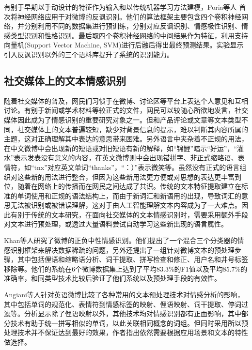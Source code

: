 有别于早期以手动设计的特征作为输入和以传统机器学习方法建模，Poria等人 \cite{poria2016deeper} 首次将神经网络应用于对微博的反讽识别。他们的算法框架主要包含四个卷积神经网络，并分别利用不同的数据集进行预训练，分别对应反讽识别、情感极性识别、情感类型识别和性格识别。最后取四个卷积神经网络的中间结果作为特征，利用支持向量机(Support Vector Machine, SVM)进行后融后得出最终预测结果。实验显示引入反讽识别以外的三个语料库提升了系统的识别能力。

\subsection{社交媒体上的文本情感识别}

随着社交媒体的普及，网民们习惯于在微博、讨论区等平台上表达个人意见和互相讨论。有别于新闻或学术材料等较正式的文件，网民可以较随心所欲地发言，社交媒体因此成为了情感识别的重要研究对象之一。但和产品评论或文章等文本类型不同，社交媒体上的文本普遍较短\cite{Madhusudhanan2018survey}，缺少对背景信息的提示，难以判断其内容所属的主题，这对正确理解其中表达的意思带来困难。另外语言中夹杂着不正规的用法，在中文微博中会出现新的短语或对旧短语有新的解释\cite{xie2012jiyu}，如“锦鲤”暗示“好运”，“灌水”表示发表没有意义的内容，在英文微博则中会出现错拼字、非正式缩略语、表情符\cite{go2009twitter}\cite{paltoglou2012twitter}，如“tnx”对应英文单词“thanks”，“：）”表示微笑等。虽然没有正式的语言组织对这些新的用法进行整合，但因为这些新用法更方便或对思想的表达更丰富到位，随着在网络上的传播而在网民之间达成了共识。传统的文本特征提取建立在标准的单词使用和正规的语法结构上，而由于新词汇和新语用的出现，导致词汇的意思无法被识别或被错误理解，这对于由人工智能理解文本内容成为了一大难点。因此有别于传统的文本研究，在面向社交媒体的文本情感识别时，需要采用额外手段对文本进行预处理，或透过大量语料尝试自动学习这些新出现的语言属性。

Khan等人\cite{khan2014tom}研究了微博的正负中性情感识别。他们提出了一个混合三个分类器的情感识别框架来解决数据稀疏的问题，另外还提出了一组针对微博文本的预处理步骤，其中包括俚语和缩略语分析、词干提取、拼写检查和修正、用户名和井号标签移除等。他们的系统在6个微博数据集上达到了平均83.3\%的F1值以及平均85.7\%的准确率，和同类型技术比较后验证了他们系统以及预处理手段的有效性。

Angiani等人\cite{angiani2016comparison}针对英语微博比较了各种常用的文本预处理技术对情感分析的影响，其中包括单词的规范化、表情符到情感标签的映射、俚语映射、词干提取、停词过滤等。分析显示除了俚语映射以外，其他技术均对情感识别都有正面影响，其中部分技术有助于统一拼写相似的单词，以此关联相同概念的词组。但同时采用所以预处理技术并不保证达到最好的效果，作者指出依然需要根据应用场景和文本的特性做选择。

